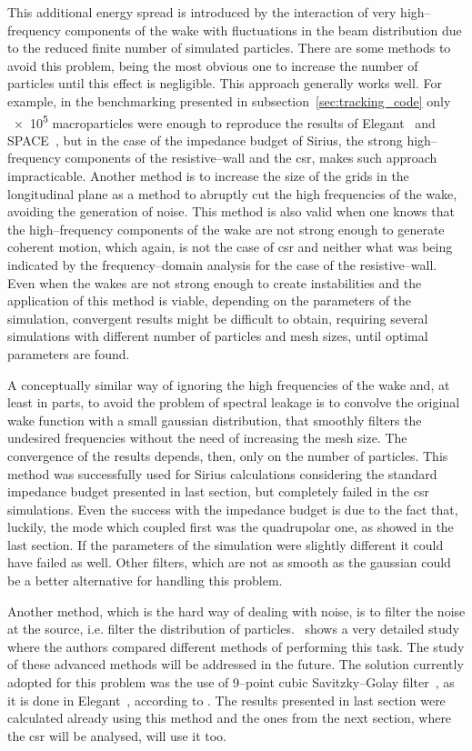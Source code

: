     This additional energy spread is introduced by the interaction of very high--frequency components of the wake with fluctuations in the beam distribution due to the reduced finite number of simulated particles. There are some methods to avoid this problem, being the most obvious one to increase the number of particles until this effect is negligible. This approach generally works well. For example, in the benchmarking presented in subsection~\ref{sec:tracking_code} only \num{e5} macroparticles were enough to reproduce the results of Elegant~\cite{Borland2000} and SPACE~\cite{Bassi2016}, but in the case of the impedance budget of Sirius, the strong high--frequency components of the resistive--wall and the \gls{csr}, makes such approach impracticable. Another method is to increase the size of the grids in the longitudinal plane as a method to abruptly cut the high frequencies of the wake, avoiding the generation of noise. This method is also valid when one knows that the high--frequency components of the wake are not strong enough to generate coherent motion, which again, is not the case of \gls{csr} and neither what was being indicated by the frequency--domain analysis for the case of the resistive--wall. Even when the wakes are not strong enough to create instabilities and the application of this method is viable, depending on the parameters of the simulation, convergent results might be difficult to obtain, requiring several simulations with different number of particles and mesh sizes, until optimal parameters are found.

    A conceptually similar way of ignoring the high frequencies of the wake and, at least in parts, to avoid the problem of spectral leakage is to convolve the original wake function with a small gaussian distribution, that smoothly filters the undesired frequencies without the need of increasing the mesh size. The convergence of the results depends, then, only on the number of particles. This method was successfully used for Sirius calculations considering the standard impedance budget presented in last section, but completely failed in the \gls{csr} simulations. Even the success with the impedance budget is due to the fact that, luckily, the mode which coupled first was the quadrupolar one, as showed in the last section. If the parameters of the simulation were slightly different it could have failed as well. Other filters, which are not as smooth as the gaussian could be a better alternative for handling this problem.

    Another method, which is the hard way of dealing with noise, is to filter the noise at the source, i.e. filter the distribution of particles.~ shows a very detailed study where the authors compared different methods of performing this task. The study of these advanced methods will be addressed in the future. The solution currently adopted for this problem was the use of 9--point cubic Savitzky--Golay filter~\cite{Savitzky1964}, as it is done in Elegant~\cite{Borland2000}, according to . The results presented in last section were calculated already using this method and the ones from the next section, where the \gls{csr} will be analysed, will use it too.

